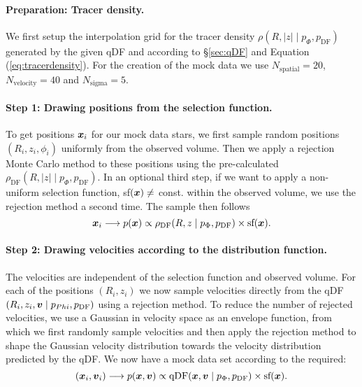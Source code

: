 \paragraph{Preparation: Tracer density.} We first setup the interpolation grid for the tracer density $\rho(R,|z| \mid p_\Phi, p_\text{DF})$ generated by the given qDF and according to \S\ref{sec:qDF} and Equation (\ref{eq:tracerdensity}). For the creation of the mock data we use $N_\text{spatial} = 20$, $N_\text{velocity} = 40$ and $N_\text{sigma}=5$.

\paragraph{Step 1: Drawing positions from the selection function.} To get positions $\boldsymbol{x}_i$ for our mock data stars, we first sample random positions $(R_i,z_i,\phi_i)$ uniformly from the observed volume. Then we apply a rejection Monte Carlo method to these positions using the pre-calculated $\rho_\text{DF}(R,|z| \mid p_{\Phi},p_\text{DF})$. In an optional third step, if we want to apply a non-uniform selection function, sf$(\boldsymbol{x}) \neq $ const. within the observed volume, we use the rejection method a second time. The sample then follows 
\begin{equation*}
\boldsymbol{x}_i \longrightarrow p(\boldsymbol{x}) \propto \rho_\text{DF}(R,z \mid p_{\Phi},p_\text{DF}) \times \text{sf}(\boldsymbol{x}).
\end{equation*}

\paragraph{Step 2: Drawing velocities according to the distribution function.} The velocities are independent of the selection function and observed volume. For each of the positions $(R_i,z_i)$ we now sample velocities directly from the qDF$(R_i,z_i,\boldsymbol{v} \mid p_{Phi},p_\text{DF})$ using a rejection method. To reduce the number of rejected velocities, we use a Gaussian in velocity space as an envelope function, from which we first randomly sample velocities and then apply the rejection method to shape the Gaussian velocity distribution towards the velocity distribution predicted by the qDF. We now have a mock data set according to the required:
\begin{equation*}
(\boldsymbol{x}_i,\boldsymbol{v}_i) \longrightarrow p(\boldsymbol{x},\boldsymbol{v}) \propto \text{qDF}(\boldsymbol{x},\boldsymbol{v} \mid p_{\Phi},p_\text{DF}) \times \text{sf}(\boldsymbol{x}).
\end{equation*} 

